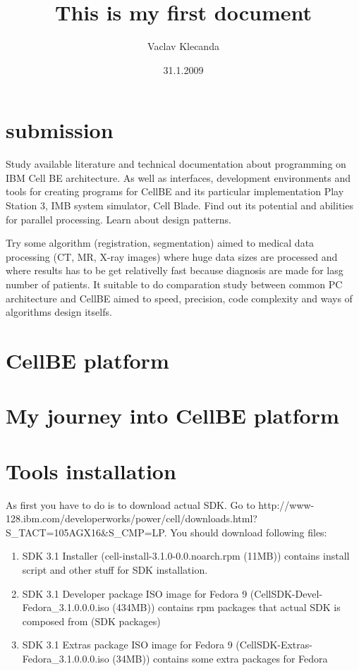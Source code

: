 \documentclass{article}
\title{This is my first document}
\author{Vaclav Klecanda}
\date{31.1.2009}
\begin{document}
\section*{submission}
Study available literature and technical documentation about programming on IBM Cell BE architecture. As well as interfaces, development environments and tools for creating programs for CellBE and its particular implementation Play Station 3, IMB system simulator, Cell Blade. Find out its potential and abilities for parallel processing. Learn about design patterns.

Try some algorithm (registration, segmentation) aimed to medical data processing (CT, MR, X-ray images) where huge data sizes are processed and where results has to be get relativelly fast because diagnosis are made for lasg number of patients. It suitable to do comparation study between common PC architecture and CellBE aimed to speed, precision, code complexity and ways of algorithms design itselfs.

\section{CellBE platform}

\section{My journey into CellBE platform}

\section{Tools installation}
As first you have to do is to download actual SDK. Go to http://www-128.ibm.com/developerworks/power/cell/downloads.html?S_TACT=105AGX16&S_CMP=LP. You should download following files:

\begin{enumerate} 
\item SDK 3.1 Installer (cell-install-3.1.0-0.0.noarch.rpm  (11MB))
contains install script and other stuff for SDK installation.
\item SDK 3.1 Developer package ISO image for Fedora 9 (CellSDK-Devel-Fedora_3.1.0.0.0.iso  (434MB))
contains rpm packages that actual SDK is composed from (SDK packages) 
\item SDK 3.1 Extras package ISO image for Fedora 9 (CellSDK-Extras-Fedora_3.1.0.0.0.iso  (34MB))
contains some extra packages for Fedora
\end{enumerate}
\end{document}

